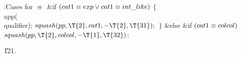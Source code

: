 \B{}:Cases for \X${}\equiv{}$\6
\&{if} ${}(\\{cat1}\equiv\\{exp}\lor\\{cat1}\equiv\\{int\_like}){}$\5
${}\{{}$\1\6
\\{app}(\\{qualifier});\6
${}\\{squash}(\\{pp},\39\T{2},\39\\{cat1},\39{-}\T{2},\39\T{31});{}$\6
\4${}\}{}$\2\6
\&{else} \&{if} ${}(\\{cat1}\equiv\\{colcol}){}$\1\5
${}\\{squash}(\\{pp},\39\T{2},\39\\{colcol},\39{-}\T{1},\39\T{32}){}$;\2\par
\U121.\fi

